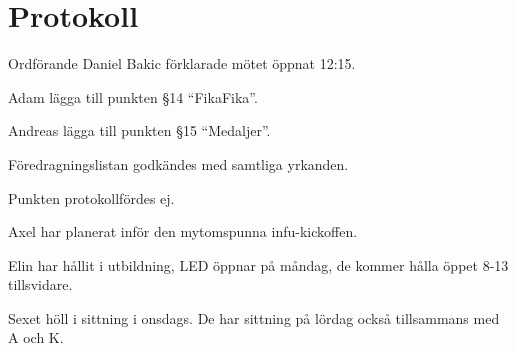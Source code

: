 \documentclass[10pt]{article}
\def\mo{Daniel Bakic}
\begin{document}
\section*{Protokoll}
\begin{paragrafer}
    Ordförande {\mo} förklarade mötet öppnat 12:15.
    
    {\valavmo}
    
    {\valavms}
    
    {\valavj}
    
    {\tosg}
    
    {\ingaadj}

    
    Adam \ypa lägga till punkten \S14 ``FikaFika''.

    Andreas \ypa lägga till punkten \S15 ``Medaljer''.

    Föredragningslistan godkändes med samtliga yrkanden.


    \begin{fyllnadsval} %
    \end{fyllnadsval}

    \begin{paragrafer}
    Punkten protokollfördes ej.

    Axel har planerat inför den mytomspunna infu-kickoffen.

    Elin har hållit i utbildning, LED öppnar på måndag, de kommer hålla öppet 8-13 tillsvidare.

    Sexet höll i sittning i onsdags. De har sittning på lördag också tillsammans med A och K.


\end{paragrafer}
\end{paragrafer}
\end{document}
